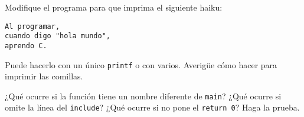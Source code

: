 Modifique el programa para que imprima el siguiente haiku:

\begin{lstlisting}
Al programar,
cuando digo "hola mundo",
aprendo C.
\end{lstlisting}

Puede hacerlo con un único \lstinline!printf! o con varios. Averigüe
cómo hacer para imprimir las comillas.

¿Qué ocurre si la función tiene un nombre diferente de \lstinline!main!?
¿Qué ocurre si omite la línea del \lstinline!include!? ¿Qué ocurre si no
pone el \lstinline!return 0!? Haga la prueba.
